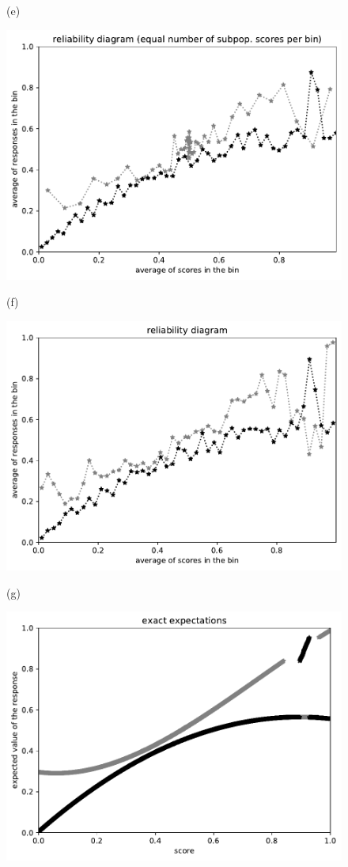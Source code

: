 \documentclass{article}
\newlength{\vertsep}
\newlength{\imsize}
\begin{document}
\begin{figure}
\begin{centering}
(e)
\parbox{\imsize}{\includegraphics[width=\imsize]
{../codes/unweighted/10000_7000_50_0/equisamps.pdf}}
\quad\quad
(f)
\parbox{\imsize}{\includegraphics[width=\imsize]
{../codes/unweighted/10000_7000_50_0/equiscore.pdf}}

\vspace{\vertsep}

(g)
\parbox{\imsize}{\includegraphics[width=\imsize]
{../codes/unweighted/10000_7000_10_0/exact.pdf}}


\end{centering}
\end{figure}
\end{document}
